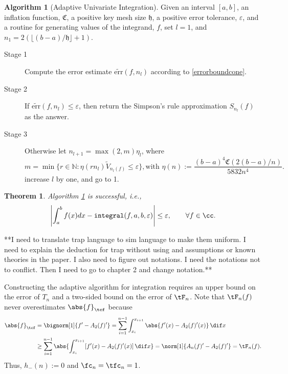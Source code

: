 \documentclass{iitthesis}
\DeclareMathOperator{\Var}{Var}
\newtheorem{theorem}{Theorem}
\theoremstyle{definition}
\newtheorem{algo}{Algorithm}
\theoremstyle{remark}
\newcommand{\Ftnorm}[1]{\abs{#1}_{\tcf}}
\begin{document}

\begin{algo}[Adaptive Univariate Integration] \label{multistageintegalgosimpson}
Given an interval $[a,b]$, an inflation function, $\mathfrak{C}$, a positive key mesh size $\mathfrak{h}$, a positive error tolerance, $\varepsilon$, and a routine for generating values of the integrand, $f$, set $l=1$, and
$n_1=2(\lfloor (b-a)/\mathfrak{h}\rfloor+1)$.%
\begin{description}
\item[Stage 1] %
Compute the error estimate $\widetilde{\text{err}}(f,n_l)$ according to \eqref{errorboundcone}.

\item[Stage 2] %
If $\widetilde{\text{err}}(f,n_l)\le\varepsilon$, then return the Simpson's rule approximation $S_{n_l}(f)$ as the answer.

\item[Stage 3] %
Otherwise let $n_{l+1}=\max(2,m)\eta_{l}$, where
$$m=\min\{r\in\mathbb{N}:\eta(rn_l)\widetilde{V}_{n_{l}(f)}\le\varepsilon\}, \text{with } \eta(n):=\frac{(b-a)^4\mathfrak{C}(2(b-a)/n)}{5832n^4}.$$
increase $l$ by one, and go to 1.
\end{description}
\end{algo}

\begin{theorem}\label{thmSimpson}
    Algorithm \ref{multistageintegalgosimpson} is successful, i.e.,
    \begin{equation*}
      \left|\int_{a}^{b}f(x)dx-\texttt{integral}(f,a,b,\varepsilon)\right|\le\varepsilon, \qquad \forall f\in \cc.
    \end{equation*}
\end{theorem}



**I need to translate trap language to sim language to make them uniform. I need to explain the deduction for trap without using and assumptions or known theories in the paper. I also need to figure out notations. I need the notations not to conflict. Then I need to go to chapter 2 and change notation.**

Constructing the adaptive algorithm for integration requires an upper bound on the error of $T_n$ and a two-sided bound on the error of $\tF_n$.  Note that $\tF_{n}(f)$ never overestimates $\Ftnorm{f}$ because
\begin{align*}
\Ftnorm{f} & = \bignorm[1]{f'-A_2(f)'}
= \sum_{i=1}^{n-1} \int_{x_i}^{x_{i+1}} \abs{f'(x) - A_2(f)'(x)} \, \dif x \\
& \ge \sum_{i=1}^{n-1} \abs{\int_{x_i}^{x_{i+1}} [f'(x) - A_2(f)'(x)] \, \dif x}=\norm[1]{A_n(f)'-A_2(f)'} = \tF_n(f).
\end{align*}
Thus, $h_{-}(n):=0$ and $\fc_n=\tfc_n=1$.
\end{document}
